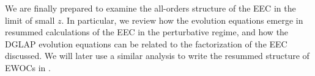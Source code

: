 We are finally prepared to examine the all-orders structure of the EEC in the limit of small \(z\).
%
In particular, we review how the  \cite{Gribov:1972ri,Dokshitzer:1977sg,Altarelli:1977zs} evolution equations emerge in resummed calculations of the EEC in the perturbative regime, and how the DGLAP evolution equations can be related to the factorization of the EEC discussed.
%
We will later use a similar analysis to write the resummed structure of EWOCs in .


\begin{figure}[t!]
    \centering
    \hfill


\end{figure}
